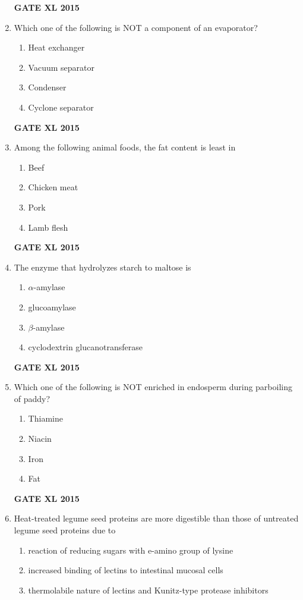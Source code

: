 \documentclass[journal,12pt,onecolumn]{IEEEtran}
\begin{document}
\begin{enumerate}
\hfill{\textbf{GATE XL 2015}}
\item Which one of the following is NOT a component of an evaporator?
    \begin{enumerate}
            \item Heat exchanger
	    \item  Vacuum separator
	    \item Condenser
            \item Cyclone separator
    \end{enumerate}
\hfill{\textbf{GATE XL 2015}}
\item Among the following animal foods, the fat content is least in
    \begin{enumerate}
            \item Beef
	    \item Chicken meat
	    \item Pork
            \item Lamb flesh
    \end{enumerate}
\hfill{\textbf{GATE XL 2015}}
\item The enzyme that hydrolyzes starch to maltose is
    \begin{enumerate}
            \item $\alpha$-amylase
	    \item glucoamylase
	    \item $\beta$-amylase
            \item cyclodextrin glucanotransferase
    \end{enumerate}
\hfill{\textbf{GATE XL 2015}}
\item Which one of the following is NOT enriched in endosperm during parboiling of paddy?
    \begin{enumerate}
            \item Thiamine
	    \item Niacin
	    \item Iron
            \item Fat
    \end{enumerate}
\hfill{\textbf{GATE XL 2015}}
\item Heat-treated legume seed proteins are more digestible than those of untreated legume seed proteins due to
    \begin{enumerate}
            \item reaction of reducing sugars with e-amino group of lysine
	    \item increased binding of lectins to intestinal mucosal cells
	    \item thermolabile nature of lectins and Kunitz-type protease inhibitors 

\end{enumerate}
\end{enumerate}
\end{document}
